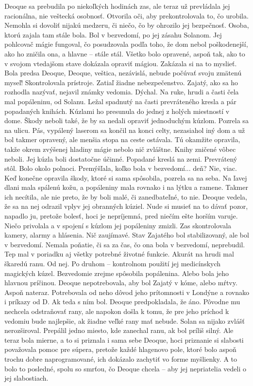 \documentclass{book}
\begin{document}
Deoque sa prebudila po niekoľkých hodinách zas, ale teraz už prevládala jej racionálna, nie veštecká osobnosť. Otvorila oči, aby prekontrolovala to, čo urobila. Nemohla si dovoliť nijakú medzeru, či niečo, čo by ohrozilo jej bezpečnosť. Osoba, ktorú zajala tam stále bola. Bol v bezvedomí, po jej zásahu Solanom. Jej pohlcovač mágie fungoval, čo posudzovala podľa toho, že dom nebol poškodenejší, ako ho zničila ona, a hlavne – stále stál. Všetko bolo opravené, aspoň tak, ako to v svojom vtedajšom stave dokázala opraviť mágiou. Zakázala si na to myslieť. Bola predsa Deoque, Deoque, veštica, nezávislá, nebude počúvať svoju zmätenú myseľ! Skontrolovala prístroje. Zatiaľ žiadne nebezpečenstvo. Zajatý, ako sa ho rozhodla nazývať, nejavil známky vedomia. Dýchal. Na ruke, hrudi a časti čela mal popáleninu, od Solanu. Ležal spadnutý na časti prevráteného kresla a pár popadaných knihách. Kúzlami ho presunula do jednej z holých miestností v dome. Škody neboli také, že by sa nedali opraviť jednoduchým kúzlom. Pozrela sa na ulicu. Pás, vypálený laserom sa končil na konci celty, nezasiahol iný dom a už bol takmer opravený, ale menšia stopa na ceste ostávala. Tú okamžite opravila, takže okrem zvýšenej hladiny mágie nebolo nič zvláštne. Knihy zničené vôbec neboli. Jej kúzla boli dostatočne účinné. Popadané kreslá na zemi. Prevrátený stôl. Bolo okolo polnoci. Premýšľala, koľko bola v bezvedomí... deň? Nie, viac. Keď konečne opravila škody, ktoré si sama spôsobila, pozrela sa na seba. Na ľavej dlani mala spálenú kožu, a popáleniny mala rovnako i na lýtku a ramene. Takmer ich necítila, ale nie preto, že by boli malé, či zanedbateľné, to nie. Deoque vedela, že sa na nej odrazil vplyv jej obranných kúziel. Nude si musieť na to dávať pozor, napadlo ju, pretože bolesť, hoci je nepríjemná, pred niečím ešte horším varuje. Niečo privolala a v spojení s kúzlom jej popáleniny zmizli. Zas skontrolovala kamery, alarmy a hlásenia. Nič zaujímavé. Stav Zajatého bol stabilizovaný, ale bol v bezvedomí. Nemala poňatie, či sa za čas, čo ona bola v bezvedomí, neprebudil. Tep mal v poriadku aj všetky potrebné životné funkcie. Akurát na hrudi mal škaredú ranu. Od nej. Po druhom – kontrolnom použití jej medicínskych magických kúzel. Bezvedomie zrejme spôsobila popálenina. Alebo bola jeho hlavnou príčinou. Deoque nepotrebovala, aby bol Zajatý v kóme, alebo mŕtvy. Aspoň nateraz. Potrebovala od neho dôvod jeho prítomnosti v Londýne a rovnako i príkazy od D. Ak teda s ním bol. Deoque predpokladala, že áno. Pôvodne mu nechcela odstraňovať rany, ale napokon došla k tomu, že pre jeho príchod k vedomiu bude najlepšie, ak žiadne veľké rany mať nebude. Solan sa nijako zvlášť nerozširoval. Prepálil jedno miesto, kde zanechal ranu, ak bol príliš silný. Ale teraz bola mierne, a to si priznala i sama sebe Deoque, hoci priznanie si slabosti považovala pomoc pre súpera, pretože každé hlagenovo pole, ktoré bolo aspoň trochu dobre naprogramované, ich dokázalo zachytiť vo forme myšlienky. A to bolo to posledné, spolu so smrťou, čo Deoque chcela – aby jej nepriatelia vedeli o jej slabostiach.
\end{document}
